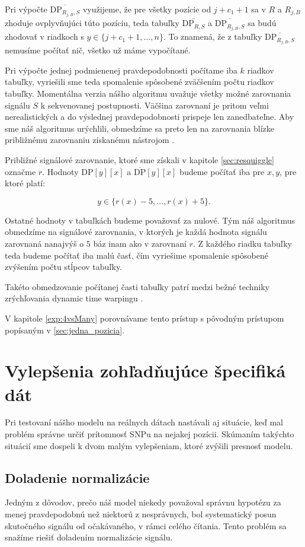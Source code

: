 Pri výpočte $\overline{\mathrm{DP}_{R_{j,B},S}}$ využijeme, že pre všetky pozície od $j+c_1+1$ sa
v $R$ a $R_{j,B}$ zhoduje \kmer{} ovplyvňujúci túto pozíciu, teda tabuľky 
$\overline{\mathrm{DP}_{R, S}}$ a $\overline{\mathrm{DP}_{R_{j,B}, S}}$ sa budú zhodovať v riadkoch s 
$y \in \{j + c_1 + 1, \dots, n\}$. To znamená, že z tabuľky $\overline{\mathrm{DP}_{R_{j,B},S}}$ 
nemusíme počítať nič, všetko už máme vypočítané.

Pri výpočte jednej podmienenej pravdepodobnosti počítame iba $k$ riadkov tabuľky, vyriešili sme
teda spomalenie spôsobené zväčšením počtu riadkov tabuľky. 
Momentálna verzia nášho algoritmu uvažuje všetky možné zarovnania signálu $S$
k sekvenovanej postupnosti. Väčšina zarovnaní je pritom veľmi nerealistických a do výslednej
pravdepodobnosti prispeje len zanedbateľne. Aby sme náš algoritmus urýchlili, obmedzíme sa preto len
na zarovnania blízke približnému zarovnaniu získanému nástrojom \resquiggle{}.

Približné signálové zarovnanie, ktoré sme získali v kapitole \ref{sec:resquiggle} označme $r$. Hodnoty
$\mathrm{DP}[y][x]$ a $\overline{\mathrm{DP}}[y][x]$ budeme počítať iba pre $x, y$, pre ktoré
platí:

$$y \in \{r(x)-5, \dots, r(x)+5\}\text{.}$$

Ostatné hodnoty v tabuľkách budeme považovať za nulové. Tým náš algoritmus obmedzíme na signálové
zarovnania, v ktorých je každá hodnota signálu zarovnaná nanajvýš o $5$ báz inam ako v zarovnaní $r$.
Z každého riadku tabuľky teda budeme počítať iba malú časť, čím vyriešime spomalenie spôsobené
zvýšením počtu stĺpcov tabuľky.

Takéto obmedzovanie počítanej časti tabuľky patrí medzi bežné techniky zrýchľovania
dynamic time warpingu \cite{FastDTW}.

V kapitole \ref{exp:4vsMany} porovnávame tento prístup s pôvodným prístupom popísaným v \ref{sec:jedna_pozicia}.


\section{Vylepšenia zohľadňujúce špecifiká dát}
\label{sec:vylepsenia}
Pri testovaní nášho modelu na reálnych dátach nastávali aj situácie, keď mal problém správne určiť 
prítomnosť SNPu na nejakej pozícii. Skúmaním takýchto situácií sme dospeli k dvom malým vylepšeniam,
ktoré zvýšili presnosť modelu.

\subsection{Doladenie normalizácie}
\label{upg:tweaking}
Jedným z dôvodov, prečo náš model niekedy považoval správnu hypotézu za menej pravdepodobnú než
niektorú z nesprávnych, bol systematický posun skutočného signálu od očakávaného, v rámci celého
čítania. Tento problém sa snažíme riešiť doladením normalizácie signálu.


